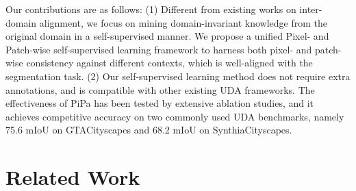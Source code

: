 \documentclass[10pt,twocolumn,letterpaper]{article}
\begin{document}
Our contributions are as follows: 
(1) Different from existing works on inter-domain alignment, we focus on mining domain-invariant knowledge from the original domain in a self-supervised manner. We propose a unified Pixel- and Patch-wise self-supervised learning framework to harness both pixel- and patch-wise consistency against different contexts, which is well-aligned with the segmentation task.
(2) Our self-supervised learning method does not require extra annotations, and is compatible with other existing UDA frameworks. The effectiveness of PiPa has been tested by extensive ablation studies, and it achieves competitive accuracy on two commonly used UDA benchmarks, namely 75.6 mIoU on GTACityscapes and 68.2 mIoU on SynthiaCityscapes.



\section{Related Work}
\end{document}

